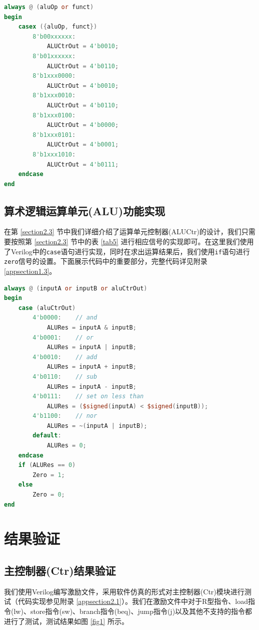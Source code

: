 \documentclass{cumcm}
\numberwithin{equation}{section}
\numberwithin{equation}{subsection}
\begin{document}
\begin{lstlisting}[language=verilog]
always @ (aluOp or funct)
begin
    casex ({aluOp, funct})
        8'b00xxxxxx: 
            ALUCtrOut = 4'b0010;
        8'b01xxxxxx:
            ALUCtrOut = 4'b0110;
        8'b1xxx0000:
            ALUCtrOut = 4'b0010;
        8'b1xxx0010:
            ALUCtrOut = 4'b0110;
        8'b1xxx0100:
            ALUCtrOut = 4'b0000;
        8'b1xxx0101:
            ALUCtrOut = 4'b0001;
        8'b1xxx1010:
            ALUCtrOut = 4'b0111;
    endcase
end
\end{lstlisting}

\subsection{算术逻辑运算单元(ALU)功能实现}\label{section3.3}

在第 \ref{section2.3} 节中我们详细介绍了运算单元控制器(ALUCtr)的设计，我们只需要按照第 \ref{section2.3} 节中的表 \ref{tab5} 进行相应信号的实现即可。在这里我们使用了Verilog中的\texttt{case}语句进行实现，同时在求出运算结果后，我们使用\texttt{if}语句进行\texttt{zero}信号的设置。下面展示代码中的重要部分，完整代码详见附录 \ref{appsection1.3}。

\begin{lstlisting}[language=verilog]
always @ (inputA or inputB or aluCtrOut)
begin
    case (aluCtrOut)
        4'b0000:    // and
            ALURes = inputA & inputB;
        4'b0001:    // or
            ALURes = inputA | inputB;
        4'b0010:    // add
            ALURes = inputA + inputB;
        4'b0110:    // sub
            ALURes = inputA - inputB;
        4'b0111:    // set on less than
            ALURes = ($signed(inputA) < $signed(inputB));
        4'b1100:    // nor
            ALURes = ~(inputA | inputB);
        default:
            ALURes = 0;
    endcase
    if (ALURes == 0)
        Zero = 1;
    else 
        Zero = 0;
end
\end{lstlisting}

\section{结果验证}\label{section4}

\subsection{主控制器(Ctr)结果验证}\label{section4.1}

我们使用Verilog编写激励文件，采用软件仿真的形式对主控制器(Ctr)模块进行测试（代码实现参见附录 \ref{appsection2.1}）。我们在激励文件中对于R型指令、load指令(lw)、store指令(sw)、branch指令(beq)、jump指令(j)以及其他不支持的指令都进行了测试，测试结果如图 \ref{fig1} 所示。
\end{document}
